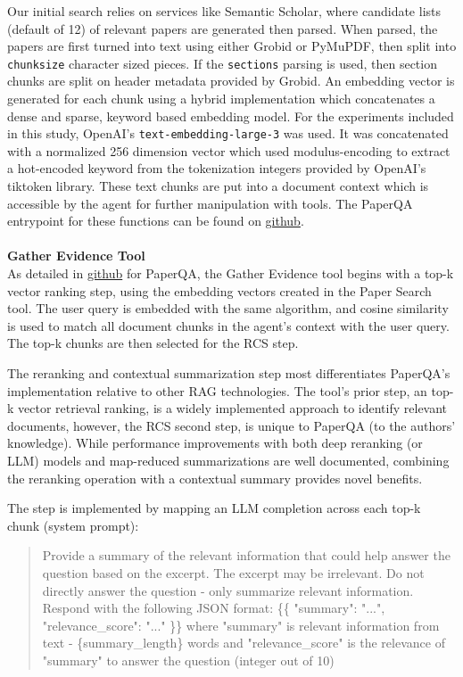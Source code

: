\documentclass{article}
\begin{document}
Our initial search relies on services like Semantic Scholar\cite{semantic-scholar}, where candidate lists (default of 12) of relevant papers are generated then parsed. When parsed, the papers are first turned into text using either Grobid or PyMuPDF, then split into \texttt{chunksize} character sized pieces. If the \texttt{sections} parsing is used, then section chunks are split on header metadata provided by Grobid. An embedding vector is generated for each chunk using a hybrid implementation which concatenates a dense and sparse, keyword based embedding model. For the experiments included in this study, OpenAI's \texttt{text-embedding-large-3} was used. It was concatenated with a normalized 256 dimension vector which used modulus-encoding to extract a hot-encoded keyword from the tokenization integers provided by OpenAI's tiktoken \cite{tiktoken} library. These text chunks are put into a document context which is accessible by the agent for further manipulation with tools. The PaperQA entrypoint for these functions can be found on \href{https://github.com/Future-House/paper-qa}{github}. \\ \\


\textbf{Gather Evidence Tool} \\

As detailed in \href{https://github.com/Future-House/paper-qa}{github} for PaperQA, the Gather Evidence tool begins with a top-k vector ranking step, using the embedding vectors created in the Paper Search tool. The user query is embedded with the same algorithm, and cosine similarity is used to match all document chunks in the agent's context with the user query. The top-k chunks are then selected for the RCS step. 

The reranking and contextual summarization step most differentiates PaperQA's implementation relative to other RAG technologies. The tool's prior step, an top-k vector retrieval ranking, is a widely implemented \cite{ma2023queryrewritingretrievalaugmentedlarge, gao2023retrieval} approach to identify relevant documents, however, the RCS second step, is unique to PaperQA (to the authors' knowledge). While performance improvements with both deep reranking (or LLM) models and map-reduced summarizations \cite{sarthi2024raptor, zhuang2023opensourcellm, gao2023chatrec, yu2024rankrag} are well documented, combining the reranking operation with a contextual summary provides novel benefits. 

The step is implemented by mapping an LLM completion across each top-k chunk (system prompt):
\begin{quote}
Provide a summary of the relevant information that could help answer the question based on the excerpt. The excerpt may be irrelevant.  Do not directly answer the question - only summarize relevant information. Respond with the following JSON format:
\{\{ "summary": "...",  \\
"relevance\_score": "..."
\}\}
where "summary" is relevant information from text - \{summary\_length\} words and "relevance\_score" is the relevance of "summary" to answer the question (integer out of 10)
\end{quote}
\end{document}
